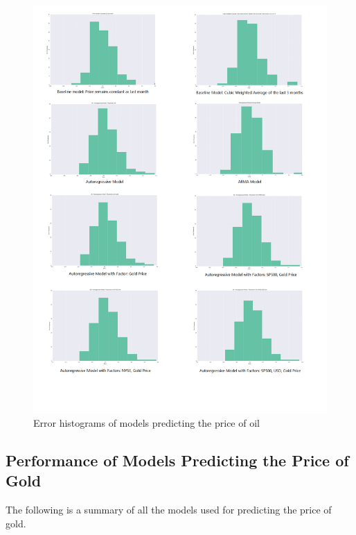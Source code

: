 \documentclass[runningheads]{llncs}
\begin{document}
\begin{figure}
\centering
\includegraphics[width=\textwidth]{OilErrorHistogram.png}
\caption{Error histograms of models predicting the price of oil}
\label{fig:OilErrorHistogram.png}
\end{figure}

\newpage

\subsection{Performance of Models Predicting the Price of Gold}

\noindent The following is a summary of all the models used for predicting the price of gold. \\
 
\end{document}
